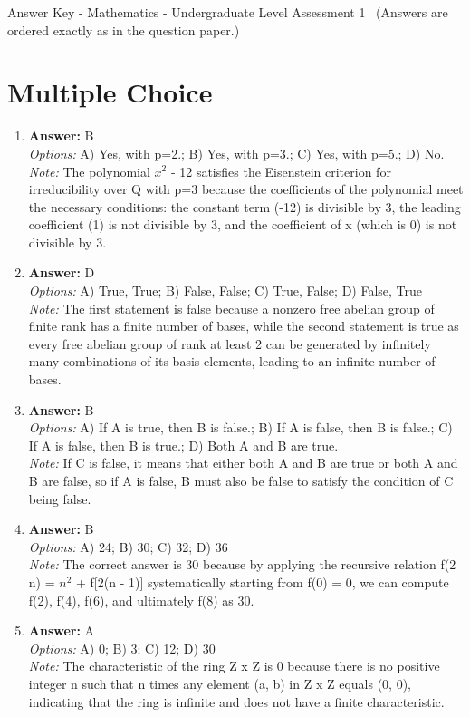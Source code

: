 \documentclass[12pt]{article}
\begin{document}
\begin{center}
Answer Key - Mathematics - Undergraduate Level Assessment 1 \
\small (Answers are ordered exactly as in the question paper.)
\end{center}

\section*{Multiple Choice}
\begin{enumerate}[label=\arabic*.]
\item \textbf{Answer:} B
\\ \textit{Options:} A) Yes, with p=2.; B) Yes, with p=3.; C) Yes, with p=5.; D) No.
\\ \textit{Note:} The polynomial $x^2$ - 12 satisfies the Eisenstein criterion for irreducibility over Q with p=3 because the coefficients of the polynomial meet the necessary conditions: the constant term (-12) is divisible by 3, the leading coefficient (1) is not divisible by 3, and the coefficient of x (which is 0) is not divisible by 3.
\item \textbf{Answer:} D
\\ \textit{Options:} A) True, True; B) False, False; C) True, False; D) False, True
\\ \textit{Note:} The first statement is false because a nonzero free abelian group of finite rank has a finite number of bases, while the second statement is true as every free abelian group of rank at least 2 can be generated by infinitely many combinations of its basis elements, leading to an infinite number of bases.
\item \textbf{Answer:} B
\\ \textit{Options:} A) If A is true, then B is false.; B) If A is false, then B is false.; C) If A is false, then B is true.; D) Both A and B are true.
\\ \textit{Note:} If C is false, it means that either both A and B are true or both A and B are false, so if A is false, B must also be false to satisfy the condition of C being false.
\item \textbf{Answer:} B
\\ \textit{Options:} A) 24; B) 30; C) 32; D) 36
\\ \textit{Note:} The correct answer is 30 because by applying the recursive relation f(2 n) = $n^2$ + f[2(n - 1)] systematically starting from f(0) = 0, we can compute f(2), f(4), f(6), and ultimately f(8) as 30.
\item \textbf{Answer:} A
\\ \textit{Options:} A) 0; B) 3; C) 12; D) 30
\\ \textit{Note:} The characteristic of the ring Z x Z is 0 because there is no positive integer n such that n times any element (a, b) in Z x Z equals (0, 0), indicating that the ring is infinite and does not have a finite characteristic.
\end{enumerate}
\end{document}
